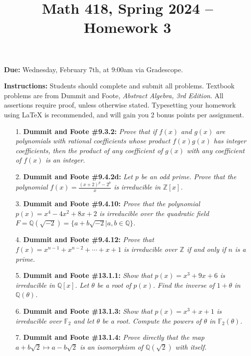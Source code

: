 \documentclass[12pt]{article}
\title{Math 418, Spring 2024 -- Homework 3}
\date{}
\newcommand{\Z}{\mathbb{Z}}
\newcommand{\Q}{\mathbb{Q}}
\newcommand{\F}{\mathbb{F}}
\begin{document}
 \maketitle
\vspace{-80pt}

\textbf{Due:} Wednesday, February 7th, at 9:00am via Gradescope.

\textbf{Instructions:} Students should complete and submit all problems. Textbook problems are from Dummit and Foote, \emph{Abstract Algebra, 3rd Edition}. All assertions require proof, unless otherwise stated. Typesetting your homework using LaTeX is recommended, and will gain you 2 bonus points per assignment.

\begin{enumerate}

\item[1.] \textbf{Dummit and Foote \#9.3.2:} \textit{Prove that if $f(x)$ and $g(x)$ are polynomials with rational coefficients whose product $f(x)g(x)$ has integer coefficients, then the product of any coefficient of $g(x)$ with any coefficient of $f(x)$ is an integer.}

\item[2.] \textbf{Dummit and Foote \#9.4.2d:} \textit{Let $p$ be an odd prime. Prove that the polynomial $f(x) = \frac{(x+2)^p - 2^p}{x}$ is irreducible in $\Z[x]$.}

\item[3.] \textbf{Dummit and Foote \#9.4.10:} \textit{Prove that the polynomial $p(x) = x^4 - 4x^2 + 8x + 2$ is irreducible over the quadratic field $F = \Q(\sqrt{-2}) = \{a + b\sqrt{-2} | a, b \in \Q\}$.}

\item[4.] \textbf{Dummit and Foote \#9.4.12:} \textit{Prove that $f(x) = x^{n-1} + x^{n-2} + \cdots + x + 1$ is irreducible over $\Z$ if and only if $n$ is a prime.}

\item[5.] \textbf{Dummit and Foote \#13.1.1:} \textit{Show that $p(x) = x^3 + 9x +6$ is irreducible in $\Q[x]$. Let $\theta$ be a root of $p(x)$. Find the inverse of $1+\theta$ in $\Q(\theta)$.}

\item[6.] \textbf{Dummit and Foote \#13.1.3:} \textit{Show that $p(x) = x^3+x+1$ is irreducible over $\F_2$ and let $\theta$ be a root. Compute the powers of $\theta$ in $\F_2(\theta)$.}

\item[7.] \textbf{Dummit and Foote \#13.1.4:} \textit{Prove directly that the map $a+b\sqrt{2}\mapsto a-b\sqrt{2}$ is an isomorphism of $\Q(\sqrt{2})$ with itself.}

\end{enumerate}
\end{document}
